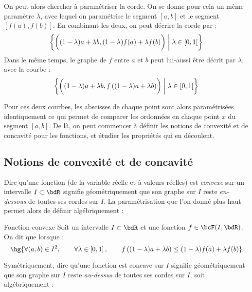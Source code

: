 \documentclass[a4paper,french,bookmarks]{report}
\begin{document}
%
\begin{minipage}{0.5\linewidth}
    On peut alors chercher à paramétriser la corde. On se donne pour cela un même paramètre $\lambda$, avec lequel on paramétrise le segment $[a, b]$ et le segment $[f(a), f(b)]$. En combinant les deux, on peut décrire la corde par :
    \[ \left\{\left(\vphantom{\dfrac{1}{2}}(1-\lambda)a + \lambda b, (1 - \lambda)f(a) + \lambda f(b)\right) \; \middle\vert \; \lambda \in \left[0, 1\right[\right\}\]
    Dans le même temps, le graphe de $f$ entre $a$ et $b$ peut lui-aussi être décrit par $\lambda$, avec la courbe :
    \[ \left\{\left(\vphantom{\dfrac{1}{2}}(1-\lambda)a + \lambda b, f\left((1-\lambda)a + \lambda b\right)\right) \; \middle\vert \; \lambda \in \left[0, 1\right[\right\}\]

\end{minipage}

\hfill

Pour ces deux courbes, les abscisses de chaque point sont alors paramétrisées identiquement ce qui permet de comparer les ordonnées en chaque point $x$ du segment $\left[a, b\right]$. De là, on peut commencer à définir les notions de convexité et de concavité pour les fonctions, et étudier les propriétés qui en découlent.

\subsection{Notions de convexité et de concavité}

Dire qu'une fonction (de la variable réelle et à valeurs réelles) est \textit{convexe} sur un intervalle $I \subset \bdR$ signifie géométriquement que son graphe sur $I$ reste \textit{en-dessous} de toutes ses cordes sur $I$. La paramétrisation que l'on donné plus-haut permet alors de définir algébriquement :

\begin{definition}{Fonction convexe}{}
    Soit un intervalle $I \subset \bdR$ et une fonction $f \in \bcF(I, \bdR)$. On dit que  lorsque :
    \[ \hg{\forall (a, b) \in I^2,\qquad \forall \lambda \in \left[0, 1\right],\qquad f\left((1 - \lambda)a + \lambda b\right) \leq (1-\lambda)f(a) + \lambda f(b)}\]
\end{definition}

Symétriquement, dire qu'une fonction est concave sur $I$ signifie géométriquement que son graphe sur $I$ reste \textit{au-dessus} de toutes ses cordes sur $I$, soit algébriquement :
\end{document}
